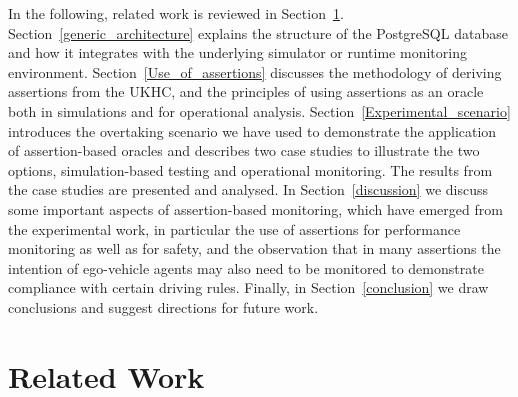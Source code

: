 In the following, related work is reviewed in Section~\ref{Related_work}. Section~\ref{generic_architecture} explains the structure of the PostgreSQL database and how it integrates with the underlying simulator or runtime monitoring environment. Section~\ref{Use_of_assertions} discusses the  methodology of deriving assertions from the UKHC, and the principles of using  assertions as an oracle both in simulations and for operational analysis. Section~\ref{Experimental_scenario} introduces the overtaking scenario we have used to demonstrate the application of assertion-based oracles and describes two case studies to illustrate the two options, simulation-based testing and operational monitoring. The results from the case studies are presented and analysed. In Section~\ref{discussion} we discuss some important aspects of assertion-based monitoring, which have emerged from the experimental work, in particular the use of assertions for performance monitoring as well as for safety, and the observation that in many assertions the intention of ego-vehicle agents may also need to be monitored to demonstrate compliance with certain driving rules. Finally, in Section~\ref{conclusion} we draw conclusions and suggest directions for future work.




\section{Related Work}
\label{Related_work}

